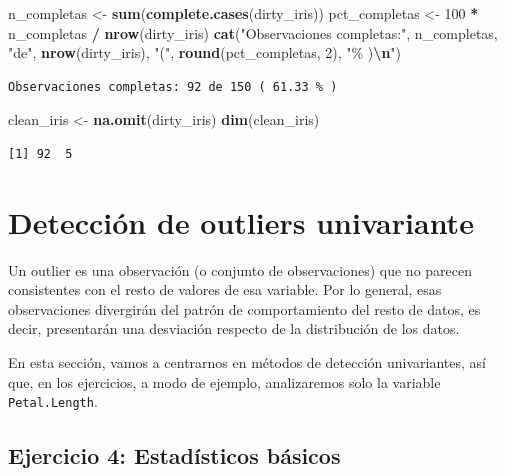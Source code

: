 \documentclass[
]{article}
\newenvironment{Shaded}{\begin{snugshade}}{\end{snugshade}}
\newcommand{\DecValTok}[1]{\textcolor[rgb]{0.00,0.00,0.81}{#1}}
\newcommand{\FunctionTok}[1]{\textcolor[rgb]{0.13,0.29,0.53}{\textbf{#1}}}
\newcommand{\NormalTok}[1]{#1}
\newcommand{\OtherTok}[1]{\textcolor[rgb]{0.56,0.35,0.01}{#1}}
\newcommand{\SpecialCharTok}[1]{\textcolor[rgb]{0.81,0.36,0.00}{\textbf{#1}}}
\newcommand{\StringTok}[1]{\textcolor[rgb]{0.31,0.60,0.02}{#1}}
\begin{document}
\begin{Shaded}
\begin{Highlighting}[]
\NormalTok{n\_completas }\OtherTok{\textless{}{-}} \FunctionTok{sum}\NormalTok{(}\FunctionTok{complete.cases}\NormalTok{(dirty\_iris))}
\NormalTok{pct\_completas }\OtherTok{\textless{}{-}} \DecValTok{100} \SpecialCharTok{*}\NormalTok{ n\_completas }\SpecialCharTok{/} \FunctionTok{nrow}\NormalTok{(dirty\_iris)}
\FunctionTok{cat}\NormalTok{(}\StringTok{"Observaciones completas:"}\NormalTok{, n\_completas, }\StringTok{"de"}\NormalTok{, }\FunctionTok{nrow}\NormalTok{(dirty\_iris),}
    \StringTok{"("}\NormalTok{, }\FunctionTok{round}\NormalTok{(pct\_completas, }\DecValTok{2}\NormalTok{), }\StringTok{"\% )}\SpecialCharTok{\textbackslash{}n}\StringTok{"}\NormalTok{)}
\end{Highlighting}
\end{Shaded}

\begin{verbatim}
Observaciones completas: 92 de 150 ( 61.33 % )
\end{verbatim}

\begin{Shaded}
\begin{Highlighting}[]
\NormalTok{clean\_iris }\OtherTok{\textless{}{-}} \FunctionTok{na.omit}\NormalTok{(dirty\_iris)}
\FunctionTok{dim}\NormalTok{(clean\_iris)}
\end{Highlighting}
\end{Shaded}

\begin{verbatim}
[1] 92  5
\end{verbatim}

\section{Detección de outliers
univariante}\label{detecciuxf3n-de-outliers-univariante}

Un outlier es una observación (o conjunto de observaciones) que no
parecen consistentes con el resto de valores de esa variable. Por lo
general, esas observaciones divergirán del patrón de comportamiento del
resto de datos, es decir, presentarán una desviación respecto de la
distribución de los datos.

En esta sección, vamos a centrarnos en métodos de detección
univariantes, así que, en los ejercicios, a modo de ejemplo,
analizaremos solo la variable \texttt{Petal.Length}.

\subsection{Ejercicio 4: Estadísticos
básicos}\label{ejercicio-4-estaduxedsticos-buxe1sicos}
\end{document}
